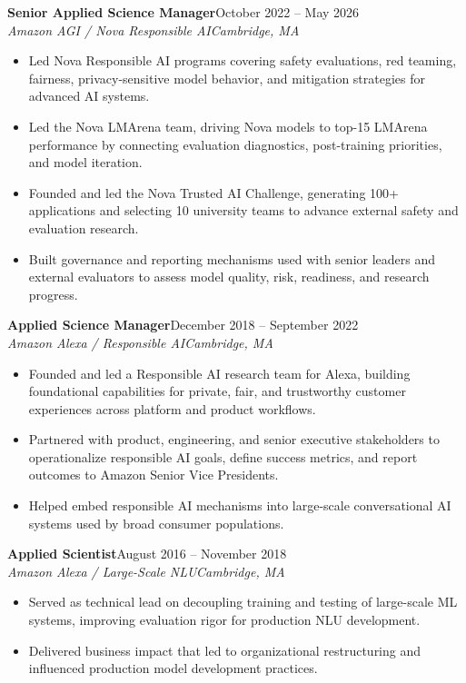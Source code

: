 \documentclass[11pt]{article}
\newcommand{\resumeentry}[5]{%
  \textbf{#1}\hfill #2\\
  \textit{#3}\hfill \textit{#4}
  \begin{itemize}
    #5
  \end{itemize}
  \vspace{2pt}
}
\begin{document}
\resumeentry
  {Senior Applied Science Manager}
  {October 2022 -- May 2026}
  {Amazon AGI / Nova Responsible AI}
  {Cambridge, MA}
  {\item Led Nova Responsible AI programs covering safety evaluations, red teaming, fairness, privacy-sensitive model behavior, and mitigation strategies for advanced AI systems.
   \item Led the Nova LMArena team, driving Nova models to top-15 LMArena performance by connecting evaluation diagnostics, post-training priorities, and model iteration.
   \item Founded and led the Nova Trusted AI Challenge, generating 100+ applications and selecting 10 university teams to advance external safety and evaluation research.
   \item Built governance and reporting mechanisms used with senior leaders and external evaluators to assess model quality, risk, readiness, and research progress.}

\resumeentry
  {Applied Science Manager}
  {December 2018 -- September 2022}
  {Amazon Alexa / Responsible AI}
  {Cambridge, MA}
  {\item Founded and led a Responsible AI research team for Alexa, building foundational capabilities for private, fair, and trustworthy customer experiences across platform and product workflows.
   \item Partnered with product, engineering, and senior executive stakeholders to operationalize responsible AI goals, define success metrics, and report outcomes to Amazon Senior Vice Presidents.
   \item Helped embed responsible AI mechanisms into large-scale conversational AI systems used by broad consumer populations.}

\resumeentry
  {Applied Scientist}
  {August 2016 -- November 2018}
  {Amazon Alexa / Large-Scale NLU}
  {Cambridge, MA}
  {\item Served as technical lead on decoupling training and testing of large-scale ML systems, improving evaluation rigor for production NLU development.
   \item Delivered business impact that led to organizational restructuring and influenced production model development practices.}

\newpage
\end{document}
